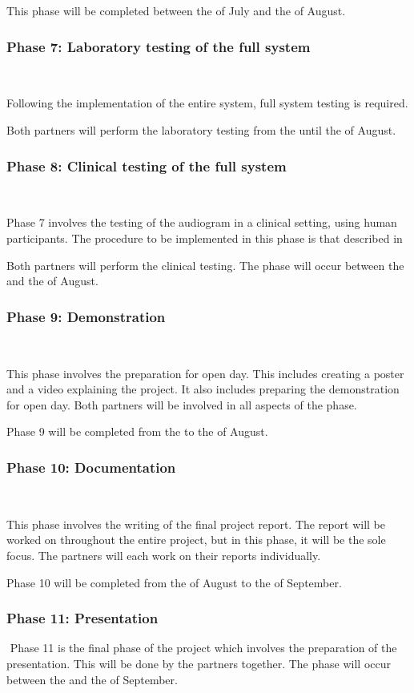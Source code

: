 \documentclass[10pt,twocolumn]{witseiepaper}
\begin{document}
This phase will be completed between the  of July and the  of August.

\subsubsection*{Phase 7: Laboratory testing of the full system} $    $

Following the implementation of the entire system, full system testing is required. 

Both partners will perform the laboratory testing from the  until the  of August.

\subsubsection*{Phase 8: Clinical testing of the full system} $    $

Phase 7 involves the testing of the audiogram in a clinical setting, using human participants. The procedure to be implemented in this phase is that described in 

Both partners will perform the clinical testing. The phase will occur between the  and the  of August.

\subsubsection*{Phase 9: Demonstration} $    $

This phase involves the preparation for open day. This includes creating a poster and a video explaining the project. It also includes preparing the demonstration for open day. Both partners will be involved in all aspects of the phase.

Phase 9 will be completed from the  to the  of August.

\subsubsection*{Phase 10: Documentation} $    $

This phase involves the writing of the final project report. The report will be worked on throughout the entire project, but in this phase, it will be the sole focus. The partners will each work on their reports individually. 

Phase 10 will be completed from the  of August to the  of September.

\subsubsection*{Phase 11: Presentation} $    $
Phase 11 is the final phase of the project which involves the preparation of the presentation. This will be done by the partners together. The phase will occur between the  and the  of September.
\end{document}
